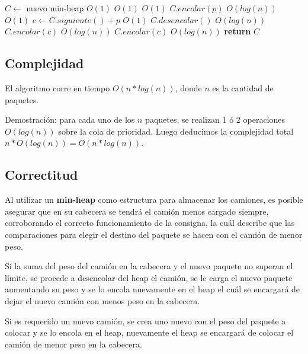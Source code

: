 \documentclass[a4paper,10pt,twoside]{article}
\newenvironment{pseudo}[1][]{%
    \vspace{0.5em}%
    \begin{algorithmic}%
}
{%
    \end{algorithmic}%
    \vspace{0.5em}%
}
\newcommand{\In}{\textbf{in} }
\newcommand{\Ode}[1]{\hfill $O(#1)$}
\begin{document}
\begin{pseudo}
        \State $C \leftarrow$ nuevo min-heap                    \Ode{1}
        \ForAll{$p$ \In $\langle p_1, \ldots, p_n \rangle$}     \Ode{1}
                                     \Ode{1}
                \State $C.encolar(p)$                           \Ode{log(n)}
                              \Ode{1}
                \State $c \leftarrow C.siguiente() + p$         \Ode{1}
                \State $C.desencolar()$                         \Ode{log(n)}
                \State $C.encolar(c)$                           \Ode{log(n)}
            \Else
                \State $C.encolar(c)$                           \Ode{log(n)}
            \EndIf
        \EndFor
        \State \textbf{return} $C$
    \EndProcedure
\end{pseudo}


\subsection{Complejidad}

El algoritmo corre en tiempo $O(n*log(n))$, donde $n$ es la cantidad de paquetes.

Demostración: para cada uno de los $n$ paquetes, se realizan 1 ó 2 operaciones $O(log(n))$ sobre la cola de prioridad. Luego deducimos la complejidad total $n * O(log(n)) = O(n * log(n))$.

\subsection{Correctitud}
Al utilizar un \textbf{min-heap} como estructura para almacenar los camiones, es posible asegurar que en su cabecera se tendrá el camión menos cargado siempre, corroborando el correcto funcionamiento de la consigna, la cuál describe que las comparaciones para elegir el destino del paquete se hacen con el camión de menor peso. 

Si la suma del peso del camión en la cabecera y el nuevo paquete no superan el límite, se procede a desencolar del heap el camión, se le carga el nuevo paquete aumentando su peso y se lo encola nuevamente en el heap el cuál se encargará de dejar el nuevo camión con menos peso en la cabecera.

Si es requerido un nuevo camión, se crea uno nuevo con el peso del paquete a colocar y se lo encola en el heap, nuevamente el heap se encargará de colocar el camión de menor peso en la cabecera.
\end{document}
